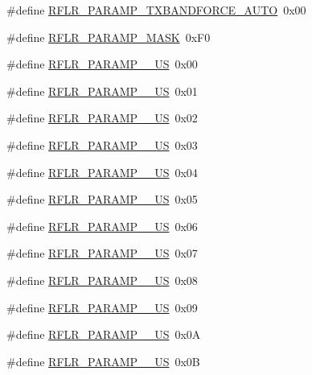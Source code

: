 \begin{DoxyCompactItemize}
\item 
\#define \mbox{\hyperlink{sx1276_regs-_lo_ra_8h_aeaf1429172c5196bcaa7f5d3079113d1}{R\+F\+L\+R\+\_\+\+P\+A\+R\+A\+M\+P\+\_\+\+T\+X\+B\+A\+N\+D\+F\+O\+R\+C\+E\+\_\+\+A\+U\+TO}}~0x00
\item 
\#define \mbox{\hyperlink{sx1276_regs-_lo_ra_8h_a8e2df5205bbee456190800ae3e6c5b48}{R\+F\+L\+R\+\_\+\+P\+A\+R\+A\+M\+P\+\_\+\+M\+A\+SK}}~0x\+F0
\item 
\#define \mbox{\hyperlink{sx1276_regs-_lo_ra_8h_a17650ac6f6503f25d99fc36183d339fb}{R\+F\+L\+R\+\_\+\+P\+A\+R\+A\+M\+P\+\_\+\_\+\+US}}~0x00
\item 
\#define \mbox{\hyperlink{sx1276_regs-_lo_ra_8h_a54e4bb780307ff67f9319190a061ed65}{R\+F\+L\+R\+\_\+\+P\+A\+R\+A\+M\+P\+\_\+\_\+\+US}}~0x01
\item 
\#define \mbox{\hyperlink{sx1276_regs-_lo_ra_8h_aa50dc8d791c24398ad463dbbe163c218}{R\+F\+L\+R\+\_\+\+P\+A\+R\+A\+M\+P\+\_\+\_\+\+US}}~0x02
\item 
\#define \mbox{\hyperlink{sx1276_regs-_lo_ra_8h_a268b294289d89cac69a2f50608292fb9}{R\+F\+L\+R\+\_\+\+P\+A\+R\+A\+M\+P\+\_\+\_\+\+US}}~0x03
\item 
\#define \mbox{\hyperlink{sx1276_regs-_lo_ra_8h_a31b242b14f8b2b7fb9bf6a0634fe43e2}{R\+F\+L\+R\+\_\+\+P\+A\+R\+A\+M\+P\+\_\+\_\+\+US}}~0x04
\item 
\#define \mbox{\hyperlink{sx1276_regs-_lo_ra_8h_a2ae8ceffd161e8c509cc076715b71c15}{R\+F\+L\+R\+\_\+\+P\+A\+R\+A\+M\+P\+\_\+\_\+\+US}}~0x05
\item 
\#define \mbox{\hyperlink{sx1276_regs-_lo_ra_8h_a23f0326e72ee3f1041d32f7edbe30733}{R\+F\+L\+R\+\_\+\+P\+A\+R\+A\+M\+P\+\_\+\_\+\+US}}~0x06
\item 
\#define \mbox{\hyperlink{sx1276_regs-_lo_ra_8h_a274b21f651fded0ec4d35ed18dc281da}{R\+F\+L\+R\+\_\+\+P\+A\+R\+A\+M\+P\+\_\+\_\+\+US}}~0x07
\item 
\#define \mbox{\hyperlink{sx1276_regs-_lo_ra_8h_a00d7b1b7436424f43314df712aa89fe2}{R\+F\+L\+R\+\_\+\+P\+A\+R\+A\+M\+P\+\_\+\_\+\+US}}~0x08
\item 
\#define \mbox{\hyperlink{sx1276_regs-_lo_ra_8h_a9ce8032bc528b8f1a56e72a0fe6fb956}{R\+F\+L\+R\+\_\+\+P\+A\+R\+A\+M\+P\+\_\+\_\+\+US}}~0x09
\item 
\#define \mbox{\hyperlink{sx1276_regs-_lo_ra_8h_ae596e916faaf110c1306996dbd93d25f}{R\+F\+L\+R\+\_\+\+P\+A\+R\+A\+M\+P\+\_\+\_\+\+US}}~0x0A
\item 
\#define \mbox{\hyperlink{sx1276_regs-_lo_ra_8h_adb4da3360a1b4adf5de2c99f86d502c7}{R\+F\+L\+R\+\_\+\+P\+A\+R\+A\+M\+P\+\_\+\_\+\+US}}~0x0B

\end{DoxyCompactItemize}
